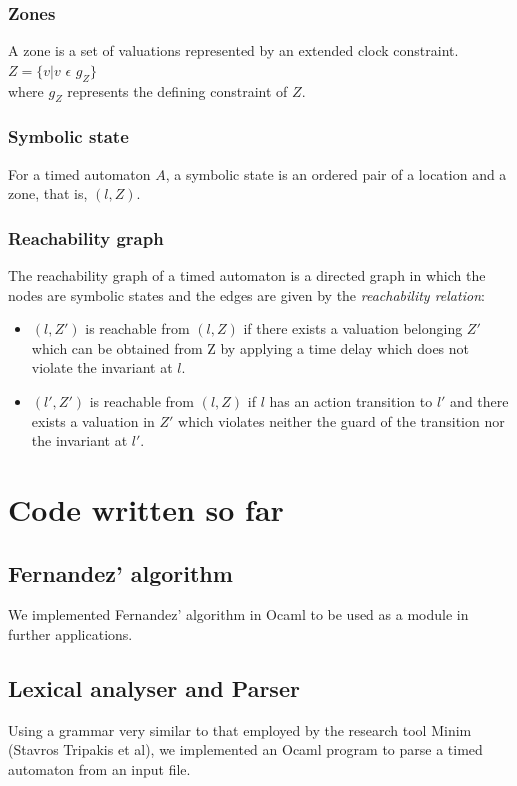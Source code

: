 \documentclass{article}
\begin{document}
\subsubsection{Zones}
A zone is a set of valuations represented by an
extended clock constraint.\\
$Z = \{v|v$ $\epsilon$ $g_Z\}$\\
where $g_Z$ represents the defining constraint of $Z$.
\subsubsection{Symbolic state}
For a timed automaton $A$, a symbolic
state is an ordered pair of a location and a zone, that is, $(l,
Z)$.
\subsubsection{Reachability graph}
The reachability graph of a timed
automaton is a directed graph in which the nodes are symbolic states
and the edges are given by the \emph{reachability relation}:
\begin{itemize}
\item $(l,Z')$ is reachable from $(l,Z)$ if there exists a
  valuation belonging $Z'$ which can be obtained
  from Z by applying a time delay which does not violate the
  invariant at $l$.

\item $(l', Z')$ is reachable from $(l, Z)$ if $l$ has an action
  transition to $l'$ and there exists a valuation in $Z'$ which
  violates neither the guard of the
  transition nor the invariant at $l'$.
\end{itemize}

\section{Code written so far}

\subsection{Fernandez' algorithm}

We implemented Fernandez' algorithm in Ocaml to be used as a module in
further applications.

\subsection{Lexical analyser and Parser}

Using a grammar very similar to that employed by the research tool Minim (Stavros
Tripakis et al), we implemented an Ocaml program to parse a timed
automaton from an input file.
\end{document}

